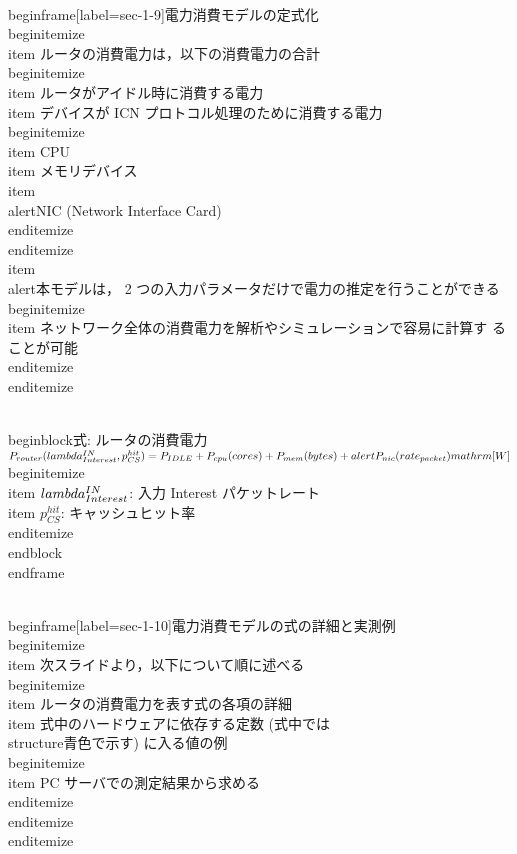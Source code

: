 {\\begin{frame}[label=sec-1-9]{電力消費モデルの定式化}
\\begin{itemize}
\\item ルータの消費電力は，以下の消費電力の合計
\\begin{itemize}
\\item ルータがアイドル時に消費する電力
\\item デバイスが ICN プロトコル処理のために消費する電力
\\begin{itemize}
\\item CPU
\\item メモリデバイス
\\item \\alert{NIC (Network Interface Card)}
\\end{itemize}
\\end{itemize}
\\item \\alert{本モデルは， 2 つの入力パラメータだけで電力の推定を行うことができる}
\\begin{itemize}
\\item ネットワーク全体の消費電力を解析やシミュレーションで容易に計算す
ることが可能
\\end{itemize}
\\end{itemize}

\\begin{block}{式: ルータの消費電力}%
$P_{router}(\\lambda^{IN}_{Interest}, p^{hit}_{CS}) = P_{IDLE} +
P_{cpu}(cores) + P_{mem}(bytes) + \\alert{P_{nic}(rate_{packet})} \\mathrm{[W]}$
\\begin{itemize}
\\item $\\lambda^{IN}_{Interest}$: 入力 Interest パケットレート
\\item $p^{hit}_{CS}$: キャッシュヒット率
\\end{itemize}
\\end{block}
\\end{frame}

\\begin{frame}[label=sec-1-10]{電力消費モデルの式の詳細と実測例}
\\begin{itemize}
\\item 次スライドより，以下について順に述べる
\\begin{itemize}
\\item ルータの消費電力を表す式の各項の詳細
\\item 式中のハードウェアに依存する定数 (式中では\\structure{青色}で示す)
に入る値の例
\\begin{itemize}
\\item PC サーバでの測定結果から求める
\\end{itemize}
\\end{itemize}
\\end{itemize}

}
